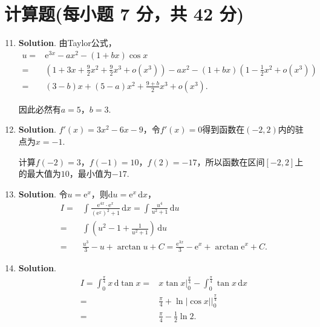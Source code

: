 \documentclass[../Main.tex]{subfiles}
\begin{document}
\section{计算题(每小题 7 分，共 42 分)}
\begin{enumerate}
    \setcounter{enumi}{10}
    \item \textbf{Solution}. 由Taylor公式，
          \[
              \begin{aligned}
                  u = & \mathrm{e}^{3x}-ax^{2}-(1+bx)\cos x                                                                                \\
                  =   & \left(1+3x+\frac{9}{2}x^{2}+\frac{9}{2}x^{3}+o(x^{3})\right)-ax^{2}-(1+bx)\left(1-\frac{1}{2}x^{2}+o(x^{3})\right) \\
                  =   & (3-b)x+(5-a)x^{2}+\frac{9+b}{2}x^{3}+o(x^{3}).
              \end{aligned}
          \]

          因此必然有$a=5$，$b=3$.

    \item \textbf{Solution}. $f'(x)=3x^{2}-6x-9$，令$f'(x)=0$得到函数在$(-2,
              2)$内的驻点为$x=-1$.

          计算$f(-2)=3$，$f(-1)=10$，$f(2)=-17$，所以函数在区间$[-2,2]$上的最大值为$1
              0$，最小值为$-17$.

    \item \textbf{Solution}. 令$u=\mathrm{e}^{x}$，则$\mathrm{d}u=\mathrm{e}
              ^{x}\,\mathrm{d}x$，
          \[
              \begin{aligned}
                  I = & \int \frac{\mathrm{e}^{4x}\cdot\mathrm{e}^x}{\left(\mathrm{e}^x\right)^2+1}\,\mathrm{d}x = \int \frac{u^4}{u^2+1}\,\mathrm{d}u \\
                  =   & \int \left(u^{2}-1+\frac{1}{u^2+1}\right)\,\mathrm{d}u                                                                         \\
                  =   & \frac{u^3}{3}-u+\arctan u + C = \frac{\mathrm{e}^{3x}}{3}-\mathrm{e}^{x}+\arctan\mathrm{e}^{x}+C.
              \end{aligned}
          \]

    \item \textbf{Solution}.
          \[
              \begin{aligned}
                  I = \int_{0}^{\frac{\pi}{4}}x\,\mathrm{d}\tan x = & x\tan x\bigg|_{0}^{\frac{\pi}{4}}-\int_{0}^{\frac{\pi}{4}}\tan x\,\mathrm{d}x \\
                  =                                                 & \frac{\pi}{4}+\ln|\cos x|\bigg|_{0}^{\frac{\pi}{4}}                           \\
                  =                                                 & \frac{\pi}{4}-\frac{1}{2}\ln 2.
              \end{aligned}
          \]


\end{enumerate}
\end{document}
